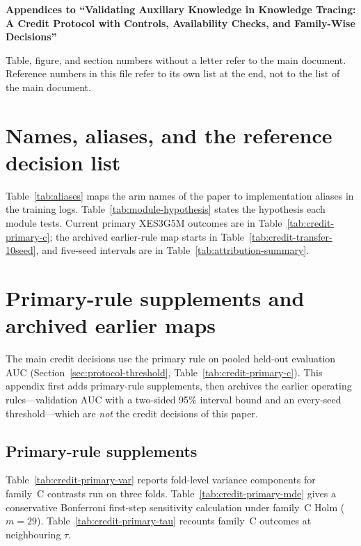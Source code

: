 \documentclass[review,12pt]{elsarticle}
\begin{document}
\begin{center}
{\large\bfseries Appendices to ``Validating Auxiliary Knowledge in
Knowledge Tracing: A Credit Protocol with Controls, Availability
Checks, and Family-Wise Decisions''}
\end{center}

\noindent Table, figure, and section numbers without a letter refer to
the main document. Reference numbers in this file refer to its own
list at the end, not to the list of the main document.

\FloatBarrier
\appendix
\renewcommand{\thealgorithm}{\Alph{section}.\arabic{algorithm}}

\FloatBarrier
\section{Names, aliases, and the reference decision list}
\label{app:names}
Table~\ref{tab:aliases} maps the arm names of the paper to
implementation aliases in the training logs.
Table~\ref{tab:module-hypothesis} states the hypothesis each module
tests. Current primary XES3G5M outcomes are in
Table~\ref{tab:credit-primary-c}; the archived earlier-rule map starts
in Table~\ref{tab:credit-transfer-10seed}, and five-seed intervals are
in Table~\ref{tab:attribution-summary}.




\section{Primary-rule supplements and archived earlier maps}
\label{app:ten-seed-stats}
The main credit decisions use the primary rule on pooled held-out
evaluation AUC (Section~\ref{sec:protocol-threshold},
Table~\ref{tab:credit-primary-c}). This appendix first adds primary-rule
supplements, then archives the earlier operating rules---validation AUC
with a two-sided 95\% interval bound and an every-seed
threshold---which are \emph{not} the credit decisions of this paper.

\subsection{Primary-rule supplements}
Table~\ref{tab:credit-primary-var} reports fold-level variance
components for family~C contrasts run on three folds.
Table~\ref{tab:credit-primary-mde} gives a conservative Bonferroni
first-step sensitivity calculation under family~C Holm ($m{=}29$).
Table~\ref{tab:credit-primary-tau} recounts family~C outcomes at
neighbouring $\tau$.
\end{document}
